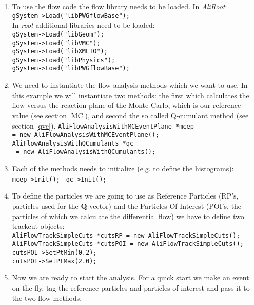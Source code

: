 \begin{enumerate}
\item
To use the flow code the flow library needs to be loaded. In  \textit{AliRoot}:\\
\texttt{gSystem->Load("libPWGflowBase");}\\
In  \textit{root} additional libraries need to be loaded: \\
\texttt{gSystem->Load("libGeom");}\\
\texttt{gSystem->Load("libVMC");}\\
\texttt{gSystem->Load("libXMLIO");}\\
\texttt{gSystem->Load("libPhysics");}\\
\texttt{gSystem->Load("libPWGflowBase");}\\
\item
We need to instantiate the flow analysis methods which we want to use. In this example we will
instantiate two methods: the first  which calculates the flow versus the reaction plane of the Monte Carlo, which is our reference value (see section \ref{MC}), 
and second the so called Q-cumulant method (see section \ref{qvc}).
\texttt{AliFlowAnalysisWithMCEventPlane *mcep} \\
\texttt{= new AliFlowAnalysisWithMCEventPlane();}\\
\texttt{AliFlowAnalysisWithQCumulants *qc}\\
 \texttt{ = new AliFlowAnalysisWithQCumulants();}\\
 \item
 Each of the methods needs to initialize (e.g. to define the histograms): \\
 \texttt{mcep->Init(); }
\texttt{qc->Init();}\\
\item
To define the particles we are going to use as Reference Particles (RP's, particles 
used for the {\bf Q} vector) and the Particles Of Interest (POI's, the particles of which 
we calculate the differential flow) we have to define two trackcut objects:\\
\texttt{AliFlowTrackSimpleCuts *cutsRP = new AliFlowTrackSimpleCuts();}\\
\texttt{AliFlowTrackSimpleCuts *cutsPOI = new AliFlowTrackSimpleCuts();}\\
\texttt{cutsPOI->SetPtMin(0.2);}\\
\texttt{cutsPOI->SetPtMax(2.0);}\\
\item
Now we are ready to start the analysis.  
For a quick start we make an event on the fly, tag the reference particles and particles of interest  and pass it to the two flow methods. \\

\end{enumerate}
